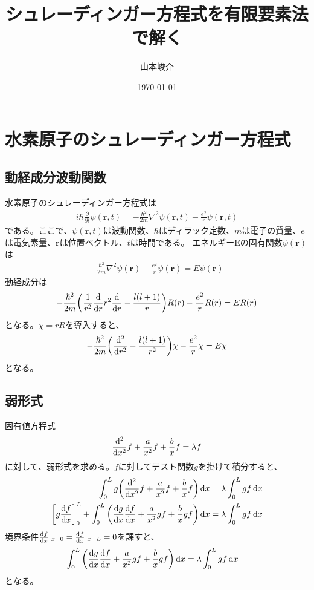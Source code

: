 \documentclass[xelatex,ja=standard]{bxjsarticle}
\title{シュレーディンガー方程式を有限要素法で解く}
\author{山本峻介}
\date{\today}
\begin{document}
\maketitle

\section{水素原子のシュレーディンガー方程式}
\subsection{動経成分波動関数}
水素原子のシュレーディンガー方程式は
\begin{align}
    i\hbar\frac{\partial}{\partial t}\psi(\bm{r},t) = -\frac{\hbar^2}{2m}\nabla^2\psi(\bm{r},t) -\frac{e^2}{r}\psi(\bm{r},t)
\end{align}
である。ここで、$\psi(\bm{r},t)$は波動関数、$\hbar$はディラック定数、$m$は電子の質量、$e$は電気素量、$\bm{r}$は位置ベクトル、$t$は時間である。
エネルギーEの固有関数$\psi(\bm{r})$は
\begin{align}
    -\frac{\hbar^2}{2m}\nabla^2\psi(\bm{r}) -\frac{e^2}{r}\psi(\bm{r}) = E\psi(\bm{r})
\end{align}
動経成分は
\begin{align}
    -\frac{\hbar^2}{2m}\qty(\frac{1}{r^2}\dv{r}r^2\dv{r} - \frac{l(l+1)}{r})R(r)
     - \frac{e^2}{r}R(r) = ER(r)
\end{align}
となる。$\chi = rR$を導入すると、
\begin{align}
    -\frac{\hbar^2}{2m}\qty(\dv[2]{r} - \frac{l(l+1)}{r^2})\chi - \frac{e^2}{r}\chi = E\chi
\end{align}
となる。

\subsection{弱形式}
固有値方程式
\begin{align}
    \dv[2]{x}f + \frac{a}{x^2}f + \frac{b}{x}f = \lambda f 
\end{align}
に対して、弱形式を求める。$f$に対してテスト関数$g$を掛けて積分すると、
\begin{align}
    \int_0^Lg\qty(\dv[2]{x}f + \frac{a}{x^2}f + \frac{b}{x}f)\dd{x} &= \lambda\int_0^Lgf\dd{x}\notag\\
    \qty[g\dv{f}{x}]_0^L+\int_0^L\qty(\dv{g}{x}\dv{f}{x} + \frac{a}{x^2}gf + \frac{b}{x}gf)\dd{x}
     &= \lambda\int_0^Lgf\dd{x}
\end{align}
境界条件$\dv{f}{x}|_{x=0} = \dv{f}{x}|_{x=L} = 0$を課すと、
\begin{align}
    \int_0^L\qty(\dv{g}{x}\dv{f}{x} + \frac{a}{x^2}gf + \frac{b}{x}gf)\dd{x}
     &= \lambda\int_0^Lgf\dd{x}\label{eq:weak}
\end{align}
となる。
\end{document}
